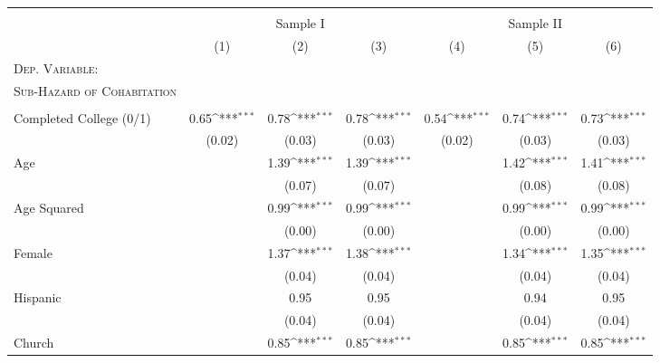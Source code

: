 {\def\sym#1{\ifmmode^{#1}\else\(^{#1}\)\fi}              \begin{tabular}{l*{6}{c}}                          \toprule 
\\[-1.8ex] & \multicolumn{3}{c}{Sample I} & \multicolumn{3}{c}{Sample II} \\ 
\cmidrule(lr){2-4} \cmidrule(lr){5-7} 		
		            &\multicolumn{1}{c}{(1)}  &\multicolumn{1}{c}{(2)}  &\multicolumn{1}{c}{(3)}         &\multicolumn{1}{c}{(4)} &\multicolumn{1}{c}{(5)}  &\multicolumn{1}{c}{(6)}        \\             \midrule             \textsc{Dep. Variable:} & & & & & & \\\textsc{Sub-Hazard of Cohabitation} & & & & & & \\ & & & & & & \\
Completed College (0/1)&     0.65\sym{***}&     0.78\sym{***}&     0.78\sym{***}&     0.54\sym{***}&     0.74\sym{***}&     0.73\sym{***}\\
                &   (0.02)         &   (0.03)         &   (0.03)         &   (0.02)         &   (0.03)         &   (0.03)         \\
Age             &                  &     1.39\sym{***}&     1.39\sym{***}&                  &     1.42\sym{***}&     1.41\sym{***}\\
                &                  &   (0.07)         &   (0.07)         &                  &   (0.08)         &   (0.08)         \\
Age Squared     &                  &     0.99\sym{***}&     0.99\sym{***}&                  &     0.99\sym{***}&     0.99\sym{***}\\
                &                  &   (0.00)         &   (0.00)         &                  &   (0.00)         &   (0.00)         \\
Female          &                  &     1.37\sym{***}&     1.38\sym{***}&                  &     1.34\sym{***}&     1.35\sym{***}\\
                &                  &   (0.04)         &   (0.04)         &                  &   (0.04)         &   (0.04)         \\
Hispanic        &                  &     0.95         &     0.95         &                  &     0.94         &     0.95         \\
                &                  &   (0.04)         &   (0.04)         &                  &   (0.04)         &   (0.04)         \\
Church          &                  &     0.85\sym{***}&     0.85\sym{***}&                  &     0.85\sym{***}&     0.85\sym{***}\\

\end{tabular}}

